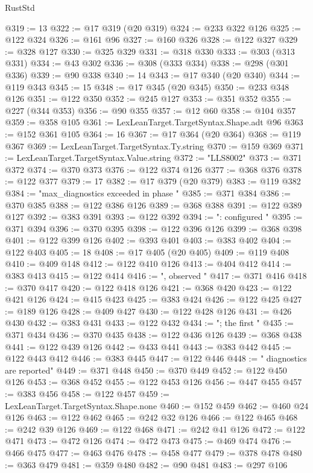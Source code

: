 \begin{lexlean}{RustStd}
\begin{coremodule}
{\begin{coremodule}
{{{{{{{{{{{{{{{{{{{{{{{{{{{{{{{{{{{{{{{{{{{{{{{{{{{{{{{{{{{{{{{{{{{{@319 := 13
@322 := @17 @319 (@20 @319)
@324 := @233 @322 @126
@325 := @122 @324
@326 := @161 @96
@327 := @160 @326
@328 := @122 @327
@329 := @328 @127
@330 := @325 @329
@331 := @318 @330
@333 := @303 (@313 @331)
@334 := @43 @302
@336 := @308 (@333 @334)
@338 := @298 (@301 @336)
@339 := @90 @338
@340 := 14
@343 := @17 @340 (@20 @340)
@344 := @119 @343
@345 := 15
@348 := @17 @345 (@20 @345)
@350 := @233 @348 @126
@351 := @122 @350
@352 := @245 @127
@353 := @351 @352
@355 := @227 (@344 @353)
@356 := @90 @355
@357 := @12 @60
@358 := @104 @357
@359 := @358 @105
@361 := LexLeanTarget.TargetSyntax.Shape.adt @96
@363 := @152 @361 @105
@364 := 16
@367 := @17 @364 (@20 @364)
@368 := @119 @367
@369 := LexLeanTarget.TargetSyntax.Ty.string
@370 := @159 @369
@371 := LexLeanTarget.TargetSyntax.Value.string
@372 := "LLS8002"
@373 := @371 @372
@374 := @370 @373
@376 := @122 @374 @126
@377 := @368 @376
@378 := @122 @377
@379 := 17
@382 := @17 @379 (@20 @379)
@383 := @119 @382
@384 := "max_diagnostics exceeded in phase "
@385 := @371 @384
@386 := @370 @385
@388 := @122 @386 @126
@389 := @368 @388
@391 := @122 @389 @127
@392 := @383 @391
@393 := @122 @392
@394 := ": configured "
@395 := @371 @394
@396 := @370 @395
@398 := @122 @396 @126
@399 := @368 @398
@401 := @122 @399 @126
@402 := @393 @401
@403 := @383 @402
@404 := @122 @403
@405 := 18
@408 := @17 @405 (@20 @405)
@409 := @119 @408
@410 := @409 @148
@412 := @122 @410 @126
@413 := @404 @412
@414 := @383 @413
@415 := @122 @414
@416 := ", observed "
@417 := @371 @416
@418 := @370 @417
@420 := @122 @418 @126
@421 := @368 @420
@423 := @122 @421 @126
@424 := @415 @423
@425 := @383 @424
@426 := @122 @425
@427 := @189 @126
@428 := @409 @427
@430 := @122 @428 @126
@431 := @426 @430
@432 := @383 @431
@433 := @122 @432
@434 := "; the first "
@435 := @371 @434
@436 := @370 @435
@438 := @122 @436 @126
@439 := @368 @438
@441 := @122 @439 @126
@442 := @433 @441
@443 := @383 @442
@445 := @122 @443 @412
@446 := @383 @445
@447 := @122 @446
@448 := " diagnostics are reported"
@449 := @371 @448
@450 := @370 @449
@452 := @122 @450 @126
@453 := @368 @452
@455 := @122 @453 @126
@456 := @447 @455
@457 := @383 @456
@458 := @122 @457
@459 := LexLeanTarget.TargetSyntax.Shape.none
@460 := @152 @459
@462 := @460 @24 @126
@463 := @122 @462
@465 := @242 @32 @126
@466 := @122 @465
@468 := @242 @39 @126
@469 := @122 @468
@471 := @242 @41 @126
@472 := @122 @471
@473 := @472 @126
@474 := @472 @473
@475 := @469 @474
@476 := @466 @475
@477 := @463 @476
@478 := @458 @477
@479 := @378 @478
@480 := @363 @479
@481 := @359 @480
@482 := @90 @481
@483 := @297 @106
}}}}}}}}}}}}}}}}}}}}}}}}}}}}}}}}}}}}}}}}}}}}}}}}}}}}}}}}}}}}}}}}}}}}
\end{coremodule}}
\end{coremodule}
\end{lexlean}
